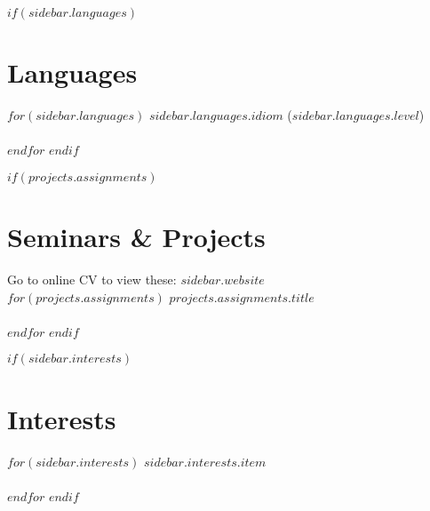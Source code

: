 \documentclass[$fontsize$, a4paper]{article}
\begin{document}
$if(sidebar.languages)$
\section*{Languages}
$for(sidebar.languages)$
\emph{$sidebar.languages.idiom$} ($sidebar.languages.level$)\\~\\
$endfor$
$endif$

$if(projects.assignments)$
\section*{Seminars \& Projects} 
{\scriptsize Go to online CV to view these: \href{http://$sidebar.website$}{$sidebar.website$}\\}
\newline
\newline
$for(projects.assignments)$
$projects.assignments.title$\\~\\
$endfor$
$endif$

$if(sidebar.interests)$
\section*{Interests}
$for(sidebar.interests)$
{$sidebar.interests.item$}\\~\\
$endfor$
$endif$
\end{document}
